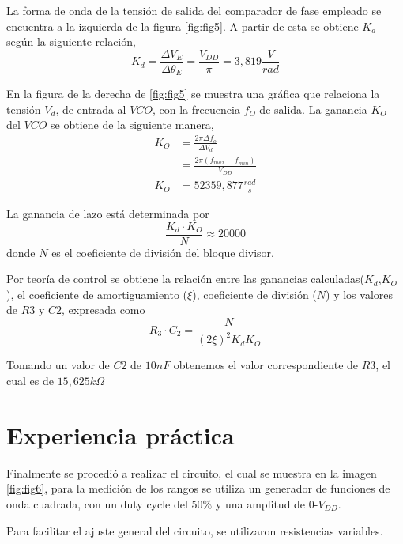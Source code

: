 \documentclass[twocolumn]{article}
\begin{document}
La forma de onda de la tensión de salida del comparador de fase empleado se encuentra a la izquierda de la figura \textcolor{blue}{{\ref{fig:fig5}}}. A partir de esta se obtiene $K_d$ según la siguiente relación,
\[ K_d = \frac{\Delta V_E}{\Delta \theta_E} = \frac{V_{DD}}{\pi} = 3,819 \frac{V}{rad} \]

En la figura de la derecha de \textcolor{blue}{{\ref{fig:fig5}}} se muestra una gráfica que relaciona la tensión $V_d$, de entrada al $VCO$, con la frecuencia $f_O$ de salida. La ganancia $K_O$ del $VCO$ se obtiene de la siguiente manera,
\begin{align*}
	K_O &= \frac{2 \pi \Delta f_o}{\Delta V_d} \\
		&= \frac{2 \pi (f_{max} - f_{min})} {V_{DD}} \\
	K_O &= 52359,877 \frac{rad}{s}
\end{align*}

La ganancia de lazo está determinada por
\[ \frac{K_d \cdot K_O}{N} \approx 20000 \]
donde $N$ es el coeficiente de división del bloque divisor.

Por teoría de control se obtiene la relación entre las ganancias calculadas($K_d$,$K_O$), el coeficiente de amortiguamiento ($\xi$), coeficiente de división ($N$) y los valores de $R3$ y $C2$, expresada como 
\[ R_{3} \cdot C_2 = \frac{N}{{(2\xi)}^2 K_d K_O}\]

Tomando un valor de $C2$ de $10nF$ obtenemos el valor correspondiente de $R3$, el cual es de $15,625 k\Omega$

\section{Experiencia práctica}
Finalmente se procedió a realizar el circuito, el cual se muestra en la imagen \textcolor{blue}{{\ref{fig:fig6}}}, para la medición de los rangos se utiliza un generador de funciones de onda cuadrada, con un duty cycle del $50\%$ y una amplitud de 0-$V_{DD}$.

Para facilitar el ajuste general del circuito, se utilizaron resistencias variables.
\end{document}
